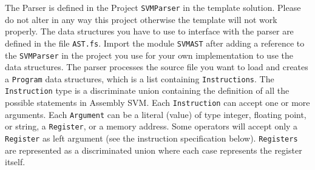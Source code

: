The Parser is defined in the Project \texttt{SVMParser} in the template solution. Please do not alter in any way this project otherwise the template will not work properly. The data structures you have to use to interface with the parser are defined in the file \texttt{AST.fs}. Import the module \texttt{SVMAST} after adding a reference to the \texttt{SVMParser} in the project you use for your own implementation to use the data structures. The parser processes the source file you want to load and creates a \texttt{Program} data structures, which is a list containing \texttt{Instructions}. The \texttt{Instruction} type is a discriminate union containing the definition of all the possible statements in Assembly SVM. Each \texttt{Instruction} can accept one or more arguments. Each \texttt{Argument} can be a literal (value) of type integer, floating point, or string, a \texttt{Register}, or a memory address. Some operators will accept only a \texttt{Register} as left argument (see the instruction specification below). \texttt{Registers} are represented as a discriminated union where each case represents the register itself.